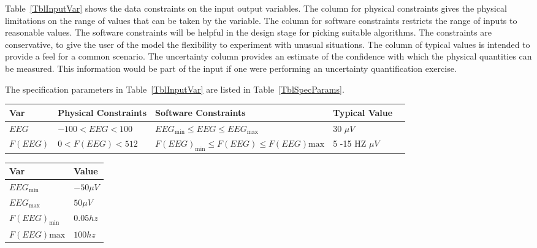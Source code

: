 \documentclass[12pt]{article}
\begin{document}
Table~\ref{TblInputVar} shows the data constraints on the input output
variables.  The column for physical constraints gives the physical limitations
on the range of values that can be taken by the variable.  The column for
software constraints restricts the range of inputs to reasonable values.  The
software constraints will be helpful in the design stage for picking suitable
algorithms.  The constraints are conservative, to give the user of the model the
flexibility to experiment with unusual situations.  The column of typical values
is intended to provide a feel for a common scenario.  The uncertainty column
provides an estimate of the confidence with which the physical quantities can be
measured.  This information would be part of the input if one were performing an
uncertainty quantification exercise.

The specification parameters in Table~\ref{TblInputVar} are listed in
Table~\ref{TblSpecParams}.

\begin{table}[!h]
  \caption{Input Variables} \label{TblInputVar}
  \renewcommand{\arraystretch}{1.2}
\noindent \begin{longtable*}{l l l l c} 
  \toprule
  \textbf{Var} & \textbf{Physical Constraints} & \textbf{Software Constraints} &
                             \textbf{Typical Value} \\
  \midrule 
  $EEG$ & $-100<EEG<100$ & $EEG_\text{min} \leq EEG \leq EEG_\text{max}$ & 30 $\mu V$   \\
  $F(EEG)$ & $0<F(EEG)<512$ & $F(EEG)_\text{min} \leq F(EEG) \leq F(EEG)\text{max}$ & 5 -15 HZ $\mu V$   \\
  \bottomrule
\end{longtable*}
\end{table}


\begin{table}[!h]
\caption{Specification Parameter Values} \label{TblSpecParams}
\renewcommand{\arraystretch}{1.2}
\noindent \begin{longtable*}{l l} 
  \toprule
  \textbf{Var} & \textbf{Value} \\
  \midrule 
  $EEG_\text{min}$ & $-50 \mu V$\\
   $EEG_\text{max}$ & $50 \mu V$\\
   $F(EEG)_\text{min}$ & $0.05 hz $\\
   $F(EEG)\text{max}$ & $100 hz $\\
  \bottomrule
\end{longtable*}
\end{table}
\end{document}

